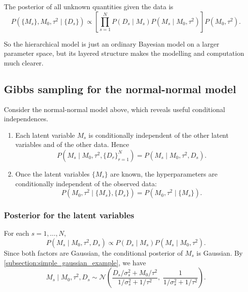 \documentclass[11pt, titlepage]{article} %
\numberwithin{equation}{section}
\theoremstyle{definition}
\numberwithin{assumption}{section}
\begin{document}
The posterior of all unknown quantities given the data is
\begin{equation*}
    P(\{M_s\},M_0,\tau^2\mid \{D_s\})
    \propto
    \left[\prod_{s=1}^N P(D_s\mid M_s)P(M_s\mid M_0,\tau^2)\right]P(M_0,\tau^2).
\end{equation*}

So the hierarchical model is just an ordinary Bayesian model on a larger parameter space, but its layered structure makes the modelling and computation much clearer.




\subsection{Gibbs sampling for the normal-normal model}
Consider the normal-normal model above, which reveals useful conditional independences.
\begin{enumerate}
    \item Each latent variable $M_s$ is conditionally independent of the other latent variables and of the other data. Hence
    \begin{equation*}
        P(M_s\mid M_0,\tau^2,\{D_r\}_{r=1}^N)
        =
        P(M_s\mid M_0,\tau^2,D_s).
    \end{equation*}
    \item Once the latent variables $\{M_s\}$ are known, the hyperparameters are conditionally independent of the observed data:
\begin{equation*}
    P(M_0,\tau^2\mid \{M_s\},\{D_s\})
    =
    P(M_0,\tau^2\mid \{M_s\}).
\end{equation*}
\end{enumerate}


\subsubsection*{Posterior for the latent variables}

For each $s=1,\dots,N$,
\begin{equation*}
    P(M_s\mid M_0,\tau^2,D_s)
    \propto
    P(D_s\mid M_s)P(M_s\mid M_0,\tau^2).
\end{equation*}
Since both factors are Gaussian, the conditional posterior of $M_s$ is Gaussian. By \cref{subsection:simple_gaussian_example}, we have
\begin{equation*}
    M_s\mid M_0,\tau^2,D_s
    \sim
    \mathcal{N}\!\left(
    \frac{D_s/\sigma_s^2 + M_0/\tau^2}{1/\sigma_s^2+1/\tau^2},
    \;
    \frac{1}{1/\sigma_s^2+1/\tau^2}
    \right).
\end{equation*}
\end{document}
